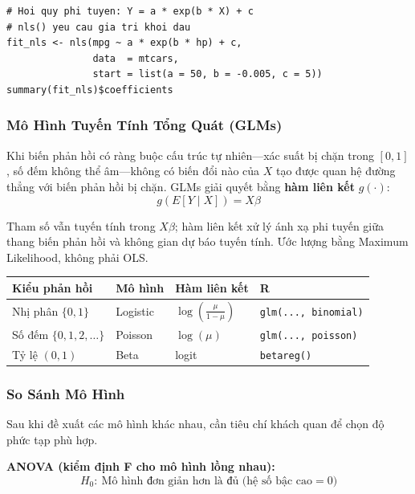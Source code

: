 \documentclass[12pt, a4paper]{article}
\begin{document}
\begin{lstlisting}[style=Rstyle]
# Hoi quy phi tuyen: Y = a * exp(b * X) + c
# nls() yeu cau gia tri khoi dau
fit_nls <- nls(mpg ~ a * exp(b * hp) + c,
               data  = mtcars,
               start = list(a = 50, b = -0.005, c = 5))
summary(fit_nls)$coefficients
\end{lstlisting}

\subsubsection{Mô Hình Tuyến Tính Tổng Quát (GLMs)}

Khi biến phản hồi có ràng buộc cấu trúc tự nhiên---xác suất bị chặn trong $[0,1]$, số đếm không thể âm---không có biến đổi nào của $X$ tạo được quan hệ đường thẳng với biến phản hồi bị chặn. GLMs giải quyết bằng \textbf{hàm liên kết} $g(\cdot)$:
\[
  g\!\left(E[Y \mid X]\right) = X\beta
\]

Tham số vẫn tuyến tính trong $X\beta$; hàm liên kết xử lý ánh xạ phi tuyến giữa thang biến phản hồi và không gian dự báo tuyến tính. Ước lượng bằng Maximum Likelihood, không phải OLS.

\begin{center}
\begin{tabular}{@{}llll@{}}
\toprule
\textbf{Kiểu phản hồi} & \textbf{Mô hình} & \textbf{Hàm liên kết} & \textbf{R} \\
\midrule
Nhị phân $\{0, 1\}$         & Logistic  & $\log\!\left(\frac{\mu}{1-\mu}\right)$ & \texttt{glm(..., binomial)} \\
Số đếm $\{0, 1, 2, \ldots\}$ & Poisson   & $\log(\mu)$ & \texttt{glm(..., poisson)} \\
Tỷ lệ $(0, 1)$              & Beta      & logit & \texttt{betareg()} \\
\bottomrule
\end{tabular}
\end{center}

\subsubsection{So Sánh Mô Hình}

Sau khi đề xuất các mô hình khác nhau, cần tiêu chí khách quan để chọn độ phức tạp phù hợp.

\textbf{ANOVA (kiểm định F cho mô hình lồng nhau):}
\[
  H_0{:}\ \text{Mô hình đơn giản hơn là đủ (hệ số bậc cao} = 0\text{)}
\]
\end{document}
